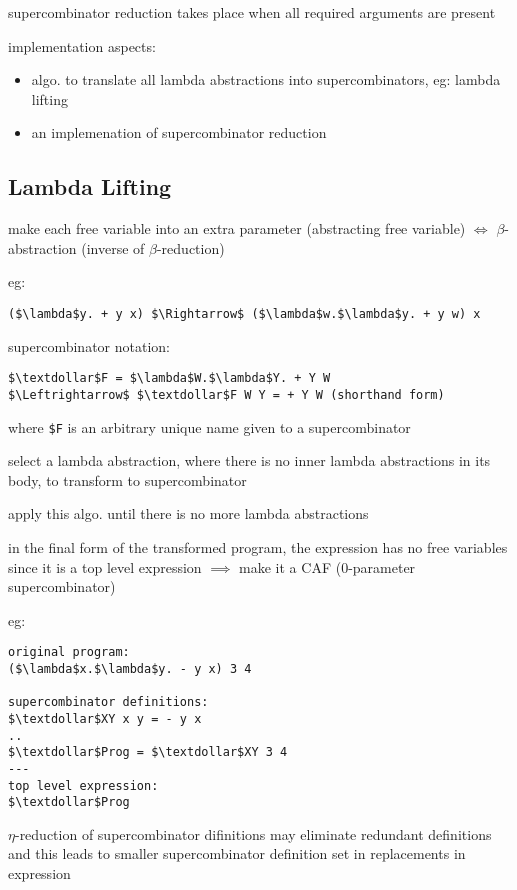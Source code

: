 \documentclass[8pt]{extarticle}
\begin{document}
\begin{multicols*}{2}
supercombinator reduction takes place when all required arguments are present

implementation aspects:
\begin{itemize}
\item algo. to translate all lambda abstractions into supercombinators, eg: lambda lifting
\item an implemenation of supercombinator reduction
\end{itemize}

\subsection{Lambda Lifting}

make each free variable into an extra parameter (abstracting free variable) $\iff$ $\beta$-abstraction (inverse of $\beta$-reduction)

eg:

\begin{lstlisting}
($\lambda$y. + y x) $\Rightarrow$ ($\lambda$w.$\lambda$y. + y w) x
\end{lstlisting}

supercombinator notation:
\begin{lstlisting}
$\textdollar$F = $\lambda$W.$\lambda$Y. + Y W
$\Leftrightarrow$ $\textdollar$F W Y = + Y W (shorthand form)
\end{lstlisting}
where \verb|$F| is an arbitrary unique name given to a supercombinator

select a lambda abstraction, where there is no inner lambda abstractions in its body, to transform to supercombinator

apply this algo. until there is no more lambda abstractions

in the final form of the transformed program, the expression has no free variables since it is a top level expression $\implies$ make it a CAF (0-parameter supercombinator)

eg:

\begin{lstlisting}
original program:
($\lambda$x.$\lambda$y. - y x) 3 4

supercombinator definitions:
$\textdollar$XY x y = - y x
..
$\textdollar$Prog = $\textdollar$XY 3 4
---
top level expression:
$\textdollar$Prog
\end{lstlisting}

$\eta$-reduction of supercombinator difinitions may eliminate redundant definitions and this leads to smaller supercombinator definition set in replacements in expression


\end{multicols*}
\end{document}
